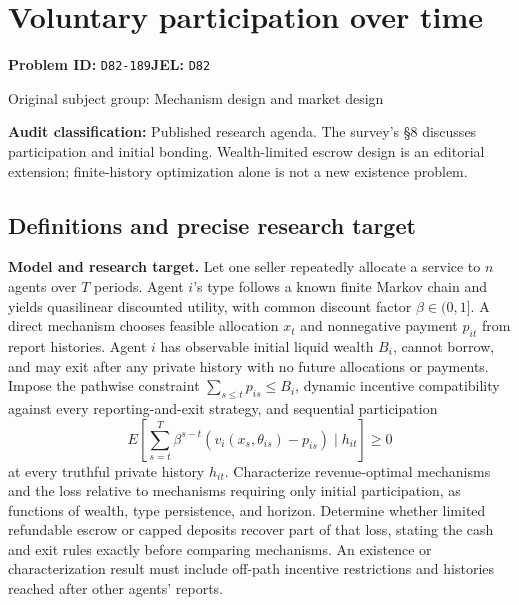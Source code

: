 \documentclass[11pt,a4paper]{article}
\begin{document}
\section*{Voluntary participation over time}
\textbf{Problem ID:} \texttt{D82-189}\quad \textbf{JEL:} \texttt{D82}\par
\label{problem:OP-0291}
{\sffamily\small\color{muted}Original subject group: Mechanism design and market design\par}
\label{definitions:problem:30007573}
\textbf{Audit classification:} Published research agenda. The survey’s §8 discusses participation and initial bonding. Wealth-limited escrow design is an editorial extension; finite-history optimization alone is not a new existence problem.
\subsection*{Definitions and precise research target}
\textbf{Model and research target.} Let one seller repeatedly allocate a service to \(n\) agents over \(T\) periods. Agent \(i\)'s type follows a known finite Markov chain and yields quasilinear discounted utility, with common discount factor \(\beta\in(0,1]\). A direct mechanism chooses feasible allocation \(x_t\) and nonnegative payment \(p_{it}\) from report histories. Agent \(i\) has observable initial liquid wealth \(B_i\), cannot borrow, and may exit after any private history with no future allocations or payments. Impose the pathwise constraint \(\sum_{s\leq t}p_{is}\leq B_i\), dynamic incentive compatibility against every reporting-and-exit strategy, and sequential participation
\[
 E\left[\sum_{s=t}^{T}\beta^{s-t}
 (v_i(x_s,\theta_{is})-p_{is})\mid h_{it}\right]\geq0
\]
at every truthful private history \(h_{it}\). Characterize revenue-optimal mechanisms and the loss relative to mechanisms requiring only initial participation, as functions of wealth, type persistence, and horizon. Determine whether limited refundable escrow or capped deposits recover part of that loss, stating the cash and exit rules exactly before comparing mechanisms. An existence or characterization result must include off-path incentive restrictions and histories reached after other agents' reports.
\end{document}
